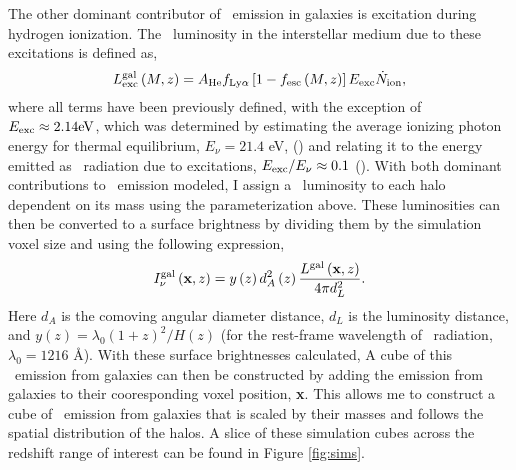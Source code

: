 The other dominant contributor of \lya\ emission in galaxies is excitation during
hydrogen ionization. The \lya\ luminosity in the interstellar medium due to these
excitations is defined as,
\begin{equation}
  L_{\rm exc}^{\rm gal} \left( M, z\right) = A_{\rm He} f_{\rm Ly\alpha} \left[ 1 - f_{\rm esc} \left( M, z\right) \right] E_{\rm exc} \dot{N}_{\rm ion},
\end{equation}
where all terms have been previously defined, with the exception of $E_{\rm exc} \approx 2.14 {\rm eV}$, which
was determined by estimating the average ionizing photon energy for thermal equilibrium, $E_{\nu} = 21.4$ eV, (\cite{2005MNRAS.362..799M})
and relating it to the energy emitted as \lya\ radiation due to excitations, $E_{\rm exc} / E_{\nu} \approx 0.1$ (\cite{1996ApJ...468..462G}).
With both dominant contributions to \lya\ emission modeled, I assign a \lya\ luminosity to each
halo dependent on its mass using the parameterization above. These luminosities can then be converted to a surface brightness by
dividing them by the simulation voxel size and using the following expression,
\begin{equation}
  I_{\nu}^{\rm gal}\left(\textbf{x}, z \right) = y \left(z \right)d_A^2 \left(z \right) \frac{L^{\rm gal} \left(\textbf{x}, z \right)}{4 \pi d_L^2}.
\end{equation}
Here $d_A$ is the comoving angular diameter distance, $d_L$ is the luminosity distance, and
$y \left( z \right) = \lambda_{0} \left( 1 + z\right)^2 / H \left(z \right)$ (for the rest-frame
wavelength of \lya\ radiation, $\lambda_0 = 1216$ \AA). With these surface brightnesses calculated,
A cube of this \lya\ emission from galaxies can then be constructed by adding the emission from
galaxies to their cooresponding voxel position, \textbf{x}. This allows me to construct
a cube of \lya\ emission from galaxies that is scaled by their masses and follows the
spatial distribution of the halos. A slice of these simulation cubes across the redshift
range of interest can be found in Figure \ref{fig:sims}.
